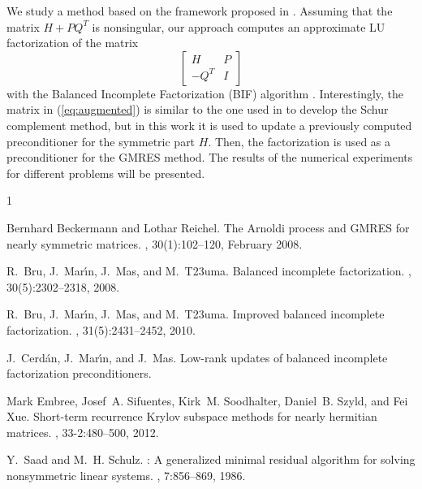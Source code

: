 \documentclass{report}
\begin{document}
We study a method based on the framework proposed in \cite{cmm:16}.
Assuming that the matrix $H+PQ^T$ is nonsingular, our approach computes
an approximate LU factorization of the matrix
\begin{equation}\label{eq:augmented}
\left[
\begin{array}{cc}
H & P\\
-Q^T & I
\end{array}
\right]
\end{equation}
with the Balanced Incomplete Factorization (BIF) algorithm
\cite{bmmt:08,bmmt:10}. Interestingly, the matrix in (\ref{eq:augmented})
is
similar to the one used in \cite{ESSSX.2012} to develop the Schur
complement method, but in this work it is used to update a previously
computed preconditioner for the symmetric part $H$. Then, the
factorization is used as a preconditioner for the GMRES method. The
results of the numerical experiments for different problems will be
presented.

\begin{thebibliography}{1}

Bernhard Beckermann and Lothar Reichel.
\newblock The {A}rnoldi process and {GMRES} for nearly symmetric matrices.
, 30(1):102--120, February 2008.

R.~Bru, J.~Mar{\'{\i}}n, J.~Mas, and M.~T\accent23uma.
\newblock Balanced incomplete factorization.
, 30(5):2302--2318, 2008.

R.~Bru, J.~Mar{\'{\i}}n, J.~Mas, and M.~T\accent23uma.
\newblock Improved balanced incomplete factorization.
, 31(5):2431--2452, 2010.

J.~Cerd\'an, J.~Mar\'{\i}n, and J.~Mas.
\newblock Low-rank updates of balanced incomplete factorization
preconditioners.

Mark Embree, Josef~A. Sifuentes, Kirk~M. Soodhalter, Daniel~B. Szyld, and Fei
Xue.
\newblock Short-term recurrence {K}rylov subspace methods for nearly hermitian
matrices.
, 33-2:480--500, 2012.

Y.~Saad and M.~H. Schulz.
: {A} generalized minimal residual algorithm for solving
nonsymmetric linear systems.
,
7:856--869, 1986.

\end{thebibliography}
\end{document}
